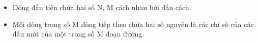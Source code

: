 \begin{itemize}
	\item Dòng đầu tiên chứa hai số N, M cách nhau bởi dấu cách.
	\item Mỗi dòng trong số M dòng tiếp theo chứa hai số nguyên là các chỉ số của các đầu mút của một trong số M đoạn đường.
\end{itemize}